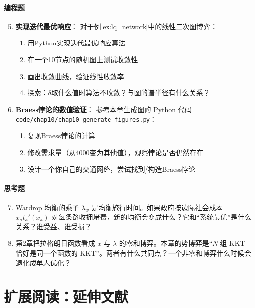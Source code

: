 \paragraph{编程题}
\begin{enumerate}
    \setcounter{enumi}{4}
    \item \textbf{实现迭代最优响应}：
    对于例\ref{ex:lq_network}中的线性二次图博弈：
    \begin{enumerate}
        \item 用Python实现迭代最优响应算法
        \item 在一个10节点的随机图上测试收敛性
        \item 画出收敛曲线，验证线性收敛率
        \item 探索：$\delta$取什么值时算法不收敛？与图的谱半径有什么关系？
    \end{enumerate}
    
    \item \textbf{Braess悖论的数值验证}：
    参考本章生成图的 Python 代码 \texttt{code/chap10/}\allowbreak\texttt{chap10\_generate\_figures.py}：
    \begin{enumerate}
        \item 复现Braess悖论的计算
        \item 修改需求量（从4000变为其他值），观察悖论是否仍然存在
        \item 设计一个你自己的交通网络，尝试找到/构造Braess悖论
    \end{enumerate}
    
\end{enumerate}

\paragraph{思考题}
\begin{enumerate}
    \setcounter{enumi}{6}
    \item Wardrop 均衡的乘子 $\lambda_w$ 是均衡旅行时间。如果政府按边际社会成本 $x_a t_a'(x_a)$ 对每条路收拥堵费，新的均衡会变成什么？它和“系统最优”是什么关系？谁受益、谁受损？
    
    \item 第2章把拉格朗日函数看成 $x$ 与 $\lambda$ 的零和博弈。本章的势博弈是“$N$ 组 KKT 恰好是同一个函数的 KKT”。两者有什么共同点？一个非零和博弈什么时候会退化成单人优化？
\end{enumerate}

\section*{扩展阅读：延伸文献}

